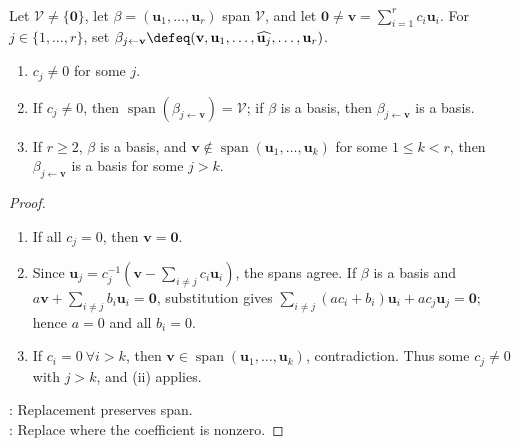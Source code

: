 \begin{lemma} \label{lem:replacement-lemma} \\
Let $\mathcal{V}\neq\{\mathbf{0}\}$, let $\beta=(\mathbf{u}_1,\ldots,\mathbf{u}_r)$ span $\mathcal{V}$, and let $\mathbf{0}\neq\mathbf{v}=\sum\limits_{i=1}^r c_i\mathbf{u}_i$. For $j\in\{1,\ldots,r\}$, set $\beta_{j\leftarrow\mathbf{v}}\defeq(\mathbf{v},\mathbf{u}_1,\ldots,\widehat{\mathbf{u}_j},\ldots,\mathbf{u}_r)$.
\begin{enumerate}[label=(\roman*)]
\setlength{\itemsep}{0pt}
\item $c_j\neq0$ for some $j$.
\item If $c_j\neq0$, then $\operatorname{span}(\beta_{j\leftarrow\mathbf{v}})=\mathcal{V}$; if $\beta$ is a basis, then $\beta_{j\leftarrow\mathbf{v}}$ is a basis.
\item If $r\geq2$, $\beta$ is a basis, and $\mathbf{v}\notin\operatorname{span}(\mathbf{u}_1,\ldots,\mathbf{u}_k)$ for some $1\leq k<r$, then $\beta_{j\leftarrow\mathbf{v}}$ is a basis for some $j>k$.
\end{enumerate}
\begin{proof}
\begin{enumerate}[label=(\roman*)]
\setlength{\itemsep}{0pt}
\item If all $c_j=0$, then $\mathbf{v}=\mathbf{0}$.
\item Since $\mathbf{u}_j=c_j^{-1}\left(\mathbf{v}-\sum\limits_{i\neq j}c_i\mathbf{u}_i\right)$, the spans agree. If $\beta$ is a basis and $a\mathbf{v}+\sum\limits_{i\neq j}b_i\mathbf{u}_i=\mathbf{0}$, substitution gives $\sum\limits_{i\neq j}(ac_i+b_i)\mathbf{u}_i+ac_j\mathbf{u}_j=\mathbf{0}$; hence $a=0$ and all $b_i=0$.
\item If $c_i=0 \ \forall i>k$, then $\mathbf{v}\in\operatorname{span}(\mathbf{u}_1,\ldots,\mathbf{u}_k)$, contradiction. Thus some $c_j\neq0$ with $j>k$, and (ii) applies.
\end{enumerate}
: Replacement preserves span.\\
: Replace where the coefficient is nonzero.
\end{proof}
\end{lemma}


